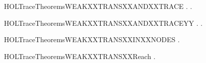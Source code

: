 \begin{SaveVerbatim}{HOLTraceTheoremsWEAKXXTRANSXXANDXXTRACE}
\HOLTokenTurnstile{} \HOLSymConst{\HOLTokenForall{}}  .
        \HOLTokenWeakTransBegin{}\HOLTokenImp{}  \HOLSymConst{\HOLTokenEquiv{}}
       \HOLSymConst{\HOLTokenExists{}}.
               \HOLSymConst{\HOLTokenConj{}} \HOLSymConst{\HOLTokenNeg{}}  \HOLSymConst{\HOLTokenConj{}}
             \HOLSymConst{=} \HOLConst{\ensuremath{\tau}}       
\end{SaveVerbatim}
\newcommand{\HOLTraceTheoremsWEAKXXTRANSXXANDXXTRACE}{\UseVerbatim{HOLTraceTheoremsWEAKXXTRANSXXANDXXTRACE}}
\begin{SaveVerbatim}{HOLTraceTheoremsWEAKXXTRANSXXANDXXTRACEYY}
\HOLTokenTurnstile{} \HOLSymConst{\HOLTokenForall{}}  .
        \HOLTokenWeakTransBegin{}\HOLTokenImp{}  \HOLSymConst{\HOLTokenEquiv{}}
       \HOLSymConst{\HOLTokenExists{}}.
               \HOLSymConst{\HOLTokenConj{}} \HOLSymConst{\HOLTokenNeg{}}  \HOLSymConst{\HOLTokenConj{}}
             \HOLSymConst{=} \HOLConst{\ensuremath{\tau}}       
\end{SaveVerbatim}
\newcommand{\HOLTraceTheoremsWEAKXXTRANSXXANDXXTRACEYY}{\UseVerbatim{HOLTraceTheoremsWEAKXXTRANSXXANDXXTRACEYY}}
\begin{SaveVerbatim}{HOLTraceTheoremsWEAKXXTRANSXXINXXNODES}
\HOLTokenTurnstile{} \HOLSymConst{\HOLTokenForall{}}  .  \HOLTokenWeakTransBegin{}\HOLTokenImp{}  \HOLSymConst{\HOLTokenImp{}}  \HOLConst{\HOLTokenIn{}}  
\end{SaveVerbatim}
\newcommand{\HOLTraceTheoremsWEAKXXTRANSXXINXXNODES}{\UseVerbatim{HOLTraceTheoremsWEAKXXTRANSXXINXXNODES}}
\begin{SaveVerbatim}{HOLTraceTheoremsWEAKXXTRANSXXReach}
\HOLTokenTurnstile{} \HOLSymConst{\HOLTokenForall{}}  .  \HOLTokenWeakTransBegin{}\HOLTokenImp{}  \HOLSymConst{\HOLTokenImp{}}   
\end{SaveVerbatim}

